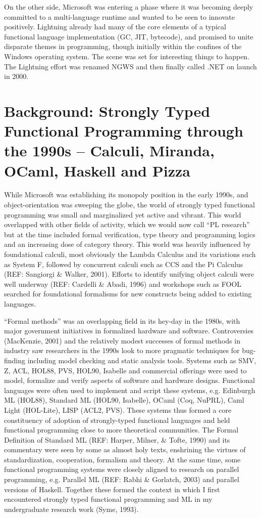 \documentclass[acmsmall,review]{acmart}\settopmatter{printfolios=true,printccs=false,printacmref=false}
\begin{document}
On the other side, Microsoft was entering a phase where it was becoming deeply committed to a multi-language runtime and wanted to be seen to innovate positively.  Lightning already had many of the core elements of a typical functional language implementation (GC, JIT, bytecode), and promised to unite disparate themes in programming, though initially within the confines of the Windows operating system. The scene was set for interesting things to happen. The Lightning effort was renamed NGWS and then finally called .NET on launch in 2000.  

\section*{Background: Strongly Typed Functional Programming through the 1990s – Calculi, Miranda, OCaml, Haskell and Pizza}

While Microsoft was establishing its monopoly position in the early 1990s, and object-orientation was sweeping the globe, the world of strongly typed functional programming was small and marginalized yet active and vibrant.  This world overlapped with other fields of activity, which we would now call “PL research” but at the time included formal verification, type theory and programming logics and an increasing dose of category theory. This world was heavily influenced by foundational calculi, most obviously the Lambda Calculus and its variations such as System F, followed by concurrent calculi such as CCS and the Pi Calculus (REF: Sangiorgi \& Walker, 2001).  Efforts to identify unifying object calculi were well underway (REF: Cardelli \& Abadi, 1996) and workshops such as FOOL searched for foundational formalisms for new constructs being added to existing languages. 

“Formal methods” was an overlapping field in its hey-day in the 1980s, with major government initiatives in formalized hardware and software.  Controversies (MacKenzie, 2001) and the relatively modest successes of formal methods in industry saw researchers in the 1990s look to more pragmatic techniques for bug-finding including model checking and static analysis tools. Systems such as SMV, Z, ACL, HOL88, PVS, HOL90, Isabelle and commercial offerings were used to model, formalize and verify aspects of software and hardware designs.   Functional languages were often used to implement and script these systems, e.g. Edinburgh ML (HOL88), Standard ML (HOL90, Isabelle), OCaml (Coq, NuPRL), Caml Light (HOL-Lite), LISP (ACL2, PVS).  These systems thus formed a core constituency of adoption of strongly-typed functional languages and held functional programming close to more theoretical communities.  The Formal Definition of Standard ML (REF: Harper, Milner, \& Tofte, 1990) and its commentary were seen by some as almost holy texts, enshrining the virtues of standardization, cooperation, formalism and theory. At the same time, some functional programming systems were closely aligned to research on parallel programming, e.g. Parallel ML (REF: Rabhi \& Gorlatch, 2003) and parallel versions of Haskell.  Together these formed the context in which I first encountered strongly typed functional programming and ML in my undergraduate research work (Syme, 1993).
\end{document}
